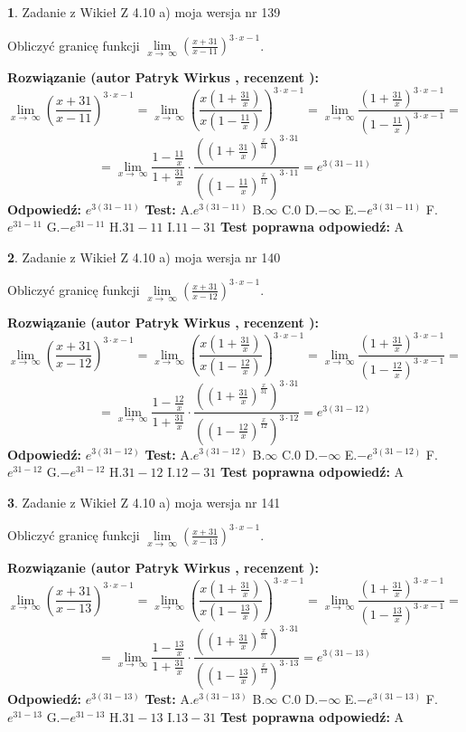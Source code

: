 \documentclass[12pt, a4paper]{article}
\theoremstyle{definition} %
\newtheorem{zad}{}
\newcommand{\zadStart}[1]{\begin{zad}#1\newline}
\newcommand{\zadStop}{\end{zad}}
\newcommand{\rozwStart}[2]{\noindent \textbf{Rozwiązanie (autor #1 , recenzent #2): }\newline}
\newcommand{\rozwStop}{\newline}
\newcommand{\odpStart}{\noindent \textbf{Odpowiedź:}\newline}
\newcommand{\odpStop}{\newline}
\newcommand{\testStart}{\noindent \textbf{Test:}\newline}
\newcommand{\testStop}{\newline}
\newcommand{\kluczStart}{\noindent \textbf{Test poprawna odpowiedź:}\newline}
\newcommand{\kluczStop}{\newline}
\begin{document}
\zadStart{Zadanie z Wikieł Z 4.10 a) moja wersja nr 139}


Obliczyć granicę funkcji  $\lim\limits_{x\to\ \infty}(\frac{x+31}{x-11})^{3\cdot x-1}$.
\zadStop
\rozwStart{Patryk Wirkus}{}
$$\lim\limits_{x\to\ \infty}(\frac{x+31}{x-11})^{3\cdot x-1} = \lim\limits_{x\to\ \infty}(\frac{x(1+\frac{31}{x})}{x(1-\frac{11}{x})})^{3\cdot x-1}=\lim\limits_{x\to\ \infty}\frac{(1+\frac{31}{x})^{3\cdot x-1}}{(1-\frac{11}{x})^{3\cdot x-1}}=$$
$$=\lim\limits_{x\to\ \infty}\frac{1-\frac{11}{x}}{1+\frac{31}{x}}\cdot\frac{((1+\frac{31}{x})^{\frac{x}{31}})^{3\cdot31}}{((1-\frac{11}{x})^{\frac{x}{11}})^{3\cdot11}}=e^{3(31-11)}$$
\rozwStop
\odpStart
$e^{3(31-11)}$
\odpStop
\testStart
A.$e^{3(31-11)}$ B.$\infty$ C.$0$ D.$-\infty$ E.$-e^{3(31-11)}$
F.$e^{31-11}$ G.$-e^{31-11}$
H.$31-11$
I.$11-31$
\testStop
\kluczStart
A
\kluczStop



\zadStart{Zadanie z Wikieł Z 4.10 a) moja wersja nr 140}


Obliczyć granicę funkcji  $\lim\limits_{x\to\ \infty}(\frac{x+31}{x-12})^{3\cdot x-1}$.
\zadStop
\rozwStart{Patryk Wirkus}{}
$$\lim\limits_{x\to\ \infty}(\frac{x+31}{x-12})^{3\cdot x-1} = \lim\limits_{x\to\ \infty}(\frac{x(1+\frac{31}{x})}{x(1-\frac{12}{x})})^{3\cdot x-1}=\lim\limits_{x\to\ \infty}\frac{(1+\frac{31}{x})^{3\cdot x-1}}{(1-\frac{12}{x})^{3\cdot x-1}}=$$
$$=\lim\limits_{x\to\ \infty}\frac{1-\frac{12}{x}}{1+\frac{31}{x}}\cdot\frac{((1+\frac{31}{x})^{\frac{x}{31}})^{3\cdot31}}{((1-\frac{12}{x})^{\frac{x}{12}})^{3\cdot12}}=e^{3(31-12)}$$
\rozwStop
\odpStart
$e^{3(31-12)}$
\odpStop
\testStart
A.$e^{3(31-12)}$ B.$\infty$ C.$0$ D.$-\infty$ E.$-e^{3(31-12)}$
F.$e^{31-12}$ G.$-e^{31-12}$
H.$31-12$
I.$12-31$
\testStop
\kluczStart
A
\kluczStop



\zadStart{Zadanie z Wikieł Z 4.10 a) moja wersja nr 141}


Obliczyć granicę funkcji  $\lim\limits_{x\to\ \infty}(\frac{x+31}{x-13})^{3\cdot x-1}$.
\zadStop
\rozwStart{Patryk Wirkus}{}
$$\lim\limits_{x\to\ \infty}(\frac{x+31}{x-13})^{3\cdot x-1} = \lim\limits_{x\to\ \infty}(\frac{x(1+\frac{31}{x})}{x(1-\frac{13}{x})})^{3\cdot x-1}=\lim\limits_{x\to\ \infty}\frac{(1+\frac{31}{x})^{3\cdot x-1}}{(1-\frac{13}{x})^{3\cdot x-1}}=$$
$$=\lim\limits_{x\to\ \infty}\frac{1-\frac{13}{x}}{1+\frac{31}{x}}\cdot\frac{((1+\frac{31}{x})^{\frac{x}{31}})^{3\cdot31}}{((1-\frac{13}{x})^{\frac{x}{13}})^{3\cdot13}}=e^{3(31-13)}$$
\rozwStop
\odpStart
$e^{3(31-13)}$
\odpStop
\testStart
A.$e^{3(31-13)}$ B.$\infty$ C.$0$ D.$-\infty$ E.$-e^{3(31-13)}$
F.$e^{31-13}$ G.$-e^{31-13}$
H.$31-13$
I.$13-31$
\testStop
\kluczStart
A
\kluczStop
\end{document}
